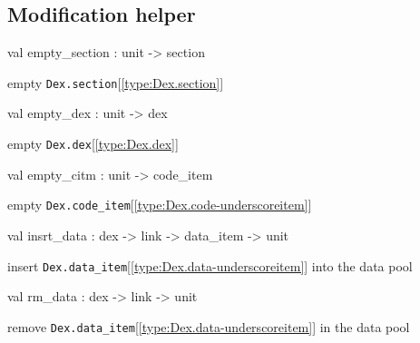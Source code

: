 \documentclass[11pt]{article}
\begin{document}
\subsection{Modification helper}




\label{val:Dex.empty-underscoresection}\begin{ocamldoccode}
val empty_section : unit -> section
\end{ocamldoccode}
\begin{ocamldocdescription}
empty {\tt{Dex.section}}[\ref{type:Dex.section}]


\end{ocamldocdescription}




\label{val:Dex.empty-underscoredex}\begin{ocamldoccode}
val empty_dex : unit -> dex
\end{ocamldoccode}
\begin{ocamldocdescription}
empty {\tt{Dex.dex}}[\ref{type:Dex.dex}]


\end{ocamldocdescription}




\label{val:Dex.empty-underscorecitm}\begin{ocamldoccode}
val empty_citm : unit -> code_item
\end{ocamldoccode}
\begin{ocamldocdescription}
empty {\tt{Dex.code\_item}}[\ref{type:Dex.code-underscoreitem}]


\end{ocamldocdescription}




\label{val:Dex.insrt-underscoredata}\begin{ocamldoccode}
val insrt_data : dex -> link -> data_item -> unit
\end{ocamldoccode}
\begin{ocamldocdescription}
insert {\tt{Dex.data\_item}}[\ref{type:Dex.data-underscoreitem}] into the data pool


\end{ocamldocdescription}




\label{val:Dex.rm-underscoredata}\begin{ocamldoccode}
val rm_data : dex -> link -> unit
\end{ocamldoccode}
\begin{ocamldocdescription}
remove {\tt{Dex.data\_item}}[\ref{type:Dex.data-underscoreitem}] in the data pool


\end{ocamldocdescription}
\end{document}
